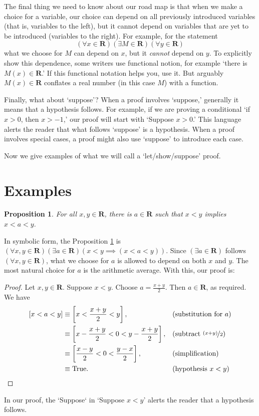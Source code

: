 \documentclass[12pt,fleqn]{article}
\newcommand{\reals}{\mathbf{R}}
\newcommand{\true}{\mathrm{True}}
\newenvironment{myproof}
  {\begin{shaded}\begin{proof}}
  {\end{proof}\end{shaded}}
\newtheorem{prop}{Proposition}
\begin{document}
The final thing we need to know about our road map is that when we 
make a choice for a variable, our choice can depend on all previously
introduced variables (that is, variables to the left), but it cannot 
depend on variables that are yet to be introduced (variables to the right). 
For example, 
for the statement
\begin{equation*}
   \left(\forall x \in \reals\right)
   \left(\exists M \in \reals\right)
   \left(\forall y \in \reals \right)
 \end{equation*}
 what we choose for $M$ can depend on $x$, but it \emph{cannot}  depend on $y$. To explicitly show this dependence, some writers
 use functional notion, for example `there is $M(x) \in \reals$.'  If this functional notation helps you, use it. But arguably  
 $M(x) \in \reals$ conflates a real number (in this case $M$) with a function.

Finally, what about `suppose'?  When a proof involves `suppose,' generally it means that a hypothesis follows. For example, if
we are proving a conditional `if $x > 0$, then $x > -1$,' our proof will start with `Suppose $x > 0$.' This language alerts the
reader that what follows `suppose' is a hypothesis.  When a proof involves special cases, a proof might also use `suppose' to 
introduce each case.

Now we give examples of what we will call a `let/show/suppose' proof.

\section{Examples}

                          
\begin{prop}
  For all $x,y \in \reals$, there is $a \in \reals$ such that
    $x < y$ implies $x<a<y$. \label{p1}   
\end{prop}
\noindent In symbolic form, the Proposition \ref{p1} is
$\left(\forall x,y \in \reals \right) 
 \left( \exists a \in \reals \right)
\left(  x < y \implies \left(x < a < y \right) \right)$.  Since $\left(\exists a \in \reals \right)$ follows 
$\left(\forall x,y \in \reals \right)$, what we choose for $a$ is allowed to 
depend on both $x$ and $y$. The most natural choice for $a$ is the
arithmetic average.  With this, our proof is:
\begin{myproof}
    Let $x,y \in \reals$. Suppose $x < y$. Choose $a = \frac{x+y}{2}$.
    Then $a \in \reals$, as required. We have
    \begin{align*}
      \left[ x < a < y \right] 
          &\equiv \left[ x < \frac{x+y}{2} < y \right], &&\text{(substitution for $a$)} \\
          & \equiv \left[ x - \frac{x+y}{2} < 0 < y - \frac{x+y}{2}  \right], &&\text{(subtract $\nicefrac{(x+y)}{2}$)} \\
          & \equiv \left[ \frac{x-y}{2} < 0 < \frac{y-x}{2}  \right], &&\text{(simplification)} \\
          & \equiv \true. && \text{(hypothesis $x < y$)} \qedhere
    \end{align*} 
\end{myproof}
\noindent In our proof, the `Suppose` in  `Suppose $x < y$' alerts the reader that a hypothesis follows.
\end{document}
